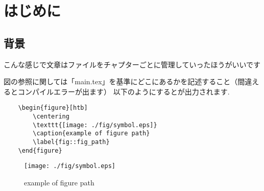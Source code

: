 \chapter{はじめに}
\section{背景}
こんな感じで文章はファイルをチャプターごとに管理していったほうがいいです

図の参照に関しては「main.tex」を基準にどこにあるかを記述すること（間違えるとコンパイルエラーが出ます）
以下のようにするとが出力されます.

\begin{verbatim}
    \begin{figure}[htb]
        \centering
        \texttt{[image: ./fig/symbol.eps]}
        \caption{example of figure path}
        \label{fig::fig_path}
    \end{figure}
\end{verbatim}


\begin{figure}[htb]
    \centering
    \texttt{[image: ./fig/symbol.eps]}
    \caption{example of figure path}
    \label{fig::fig_path}
\end{figure}
